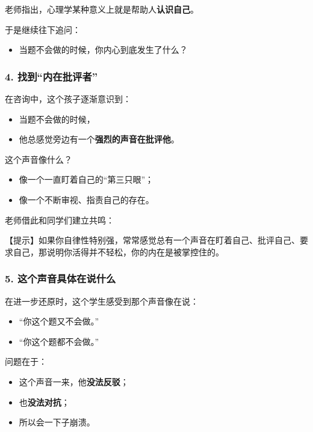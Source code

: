 \documentclass[
  chinese,
  9pt,
  a4paper,
]{ctexart}
\providecommand{\tightlist}{%
  \setlength{\itemsep}{0pt}\setlength{\parskip}{0pt}}
\begin{document}
老师指出，心理学某种意义上就是帮助人\textbf{认识自己}。

于是继续往下追问：

\begin{itemize}
\tightlist
\item
  当题不会做的时候，你内心到底发生了什么？
\end{itemize}

\subsubsection{4.
找到``内在批评者''}\label{ux627eux5230ux5185ux5728ux6279ux8bc4ux8005}

在咨询中，这个孩子逐渐意识到：

\begin{itemize}
\tightlist
\item
  当题不会做的时候，
\item
  他总感觉旁边有一个\textbf{强烈的声音在批评他}。
\end{itemize}

这个声音像什么？

\begin{itemize}
\tightlist
\item
  像一个一直盯着自己的``第三只眼''；
\item
  像一个不断审视、指责自己的存在。
\end{itemize}

老师借此和同学们建立共鸣：

【提示】如果你自律性特别强，常常感觉总有一个声音在盯着自己、批评自己、要求自己，那说明你活得并不轻松，你的内在是被掌控住的。

\subsubsection{5.
这个声音具体在说什么}\label{ux8fd9ux4e2aux58f0ux97f3ux5177ux4f53ux5728ux8bf4ux4ec0ux4e48}

在进一步还原时，这个学生感受到那个声音像在说：

\begin{itemize}
\tightlist
\item
  ``你这个题又不会做。''
\item
  ``你这个题都不会做。''
\end{itemize}

问题在于：

\begin{itemize}
\tightlist
\item
  这个声音一来，他\textbf{没法反驳}；
\item
  也\textbf{没法对抗}；
\item
  所以会一下子崩溃。
\end{itemize}
\end{document}
